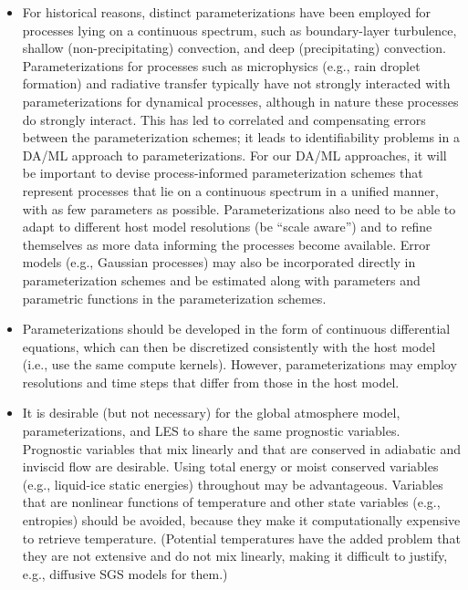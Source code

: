 \documentclass{article}
\begin{document}
\begin{itemize}
    \item For historical reasons, distinct parameterizations have been employed for processes lying on a continuous spectrum, such as boundary-layer turbulence, shallow (non-precipitating) convection, and deep (precipitating) convection. Parameterizations for processes such as microphysics (e.g., rain droplet formation) and radiative transfer typically have not strongly interacted with parameterizations for dynamical processes, although in nature these processes do strongly interact. This has led to correlated and compensating errors between the parameterization schemes; it leads to identifiability problems in a DA/ML approach to parameterizations. For our DA/ML approaches, it will be important to devise process-informed parameterization schemes that represent processes that lie on a continuous spectrum in a unified manner, with as few parameters as possible. Parameterizations also need to be able to adapt to different host model resolutions (be ``scale aware'') and to refine themselves as more data informing the processes become available. Error models (e.g., Gaussian processes) may also be incorporated directly in parameterization schemes and be estimated along with parameters and parametric functions in the parameterization schemes. 
    \item Parameterizations should be developed in the form of continuous differential equations, which can then be discretized consistently with the host model (i.e., use the same compute kernels). However, parameterizations may employ resolutions and time steps that differ from those in the host model. 
    \item It is desirable (but not necessary) for the global atmosphere model, parameterizations, and LES to share the same prognostic variables. Prognostic variables that mix linearly and that are conserved in adiabatic and inviscid flow are desirable. Using total energy or moist conserved variables (e.g., liquid-ice static energies) throughout may be advantageous. Variables that are nonlinear functions of temperature and other state variables (e.g., entropies) should be avoided, because they make it computationally expensive to retrieve temperature. (Potential temperatures have the added problem that they are not extensive and do not mix linearly, making it difficult to justify, e.g., diffusive SGS models for them.) 
\end{itemize}
\end{document}
